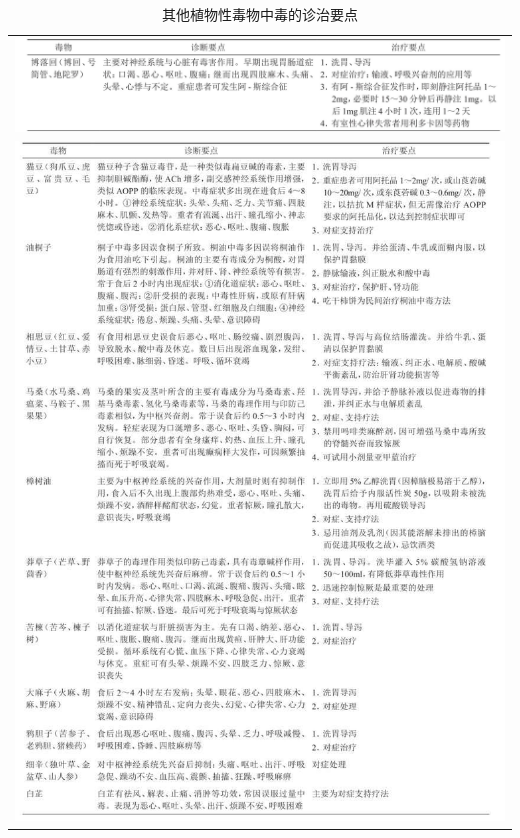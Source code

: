 \begin{longtable}{c}
 \caption{其他植物性毒物中毒的诊治要点}
 \label{tab59-1}
 \endfirsthead
 \caption[]{其他植物性毒物中毒的诊治要点}
 \endhead
 \includegraphics[width=\textwidth,height=\textheight,keepaspectratio]{./images/Image00224.jpg}\\
 \includegraphics[width=\textwidth,height=\textheight,keepaspectratio]{./images/Image00225.jpg}\\

\end{longtable}
